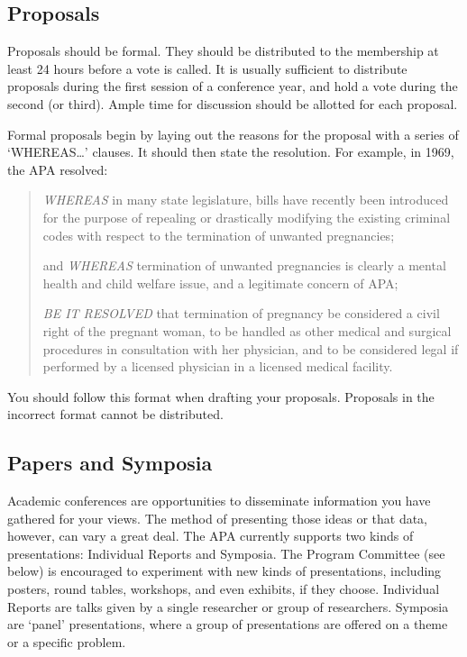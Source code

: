 \begin{refsection}
\subsection{Proposals}
\label{proposals}

Proposals should be formal. They should be distributed to the membership at least 24 hours before a vote is called. It is usually sufficient to distribute proposals during the first session of a conference year, and hold a vote during the second (or third). Ample time for discussion should be allotted for each proposal.

Formal proposals begin by laying out the reasons for the proposal with a series of `WHEREAS{\ldots}' clauses. It should then state the resolution. For example, in 1969, the APA resolved:

\begin{quote}

\emph{WHEREAS} in many state legislature, bills have recently been introduced for the purpose of repealing or drastically modifying the existing criminal codes with respect to the termination of unwanted pregnancies;

and \emph{WHEREAS} termination of unwanted pregnancies is clearly a mental health and child welfare issue, and a legitimate concern of APA;

\emph{BE IT RESOLVED} that termination of pregnancy be considered a civil right of the pregnant woman, to be handled as other medical and surgical procedures in consultation with her physician, and to be considered legal if performed by a licensed physician in a licensed medical facility.
\end{quote}

You should follow this format when drafting your proposals. Proposals in the incorrect format cannot be distributed.

\subsection{Papers and Symposia}
\label{papersandsymposia}

Academic conferences are opportunities to disseminate information you have gathered for your views. The method of presenting those ideas or that data, however, can vary a great deal. The APA currently supports two kinds of presentations: Individual Reports and Symposia. The Program Committee (see below) is encouraged to experiment with new kinds of presentations, including posters, round tables, workshops, and even exhibits, if they choose. Individual Reports are talks given by a single researcher or group of researchers. Symposia are `panel' presentations, where a group of presentations are offered on a theme or a specific problem.


\end{refsection}
